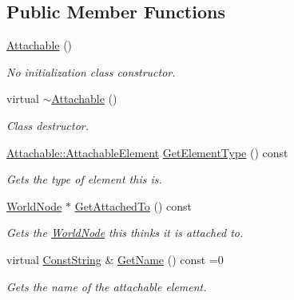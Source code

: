 \subsection*{Public Member Functions}
\begin{DoxyCompactItemize}
\item 
\hypertarget{classphys_1_1Attachable_a93c18f22769a1f70ae300fc2c58210eb}{
\hyperlink{classphys_1_1Attachable_a93c18f22769a1f70ae300fc2c58210eb}{Attachable} ()}
\label{df/dbd/classphys_1_1Attachable_a93c18f22769a1f70ae300fc2c58210eb}

\begin{DoxyCompactList}\small\item\em No initialization class constructor. \item\end{DoxyCompactList}\item 
\hypertarget{classphys_1_1Attachable_af7187e29053b7fe339634394883729d4}{
virtual \hyperlink{classphys_1_1Attachable_af7187e29053b7fe339634394883729d4}{$\sim$Attachable} ()}
\label{df/dbd/classphys_1_1Attachable_af7187e29053b7fe339634394883729d4}

\begin{DoxyCompactList}\small\item\em Class destructor. \item\end{DoxyCompactList}\item 
\hyperlink{classphys_1_1Attachable_acd1fca033e7cc0bb3024a92d466d213a}{Attachable::AttachableElement} \hyperlink{classphys_1_1Attachable_a57d60b84bd49bf35732164ae4244e576}{GetElementType} () const 
\begin{DoxyCompactList}\small\item\em Gets the type of element this is. \item\end{DoxyCompactList}\item 
\hyperlink{classphys_1_1WorldNode}{WorldNode} $\ast$ \hyperlink{classphys_1_1Attachable_a6df6034ed61c98d350378bdd7a3129f6}{GetAttachedTo} () const 
\begin{DoxyCompactList}\small\item\em Gets the \hyperlink{classphys_1_1WorldNode}{WorldNode} this thinks it is attached to. \item\end{DoxyCompactList}\item 
\hypertarget{classphys_1_1Attachable_a0a07d727fa2630dc3550fd991ca28256}{
virtual \hyperlink{namespacephys_a5ce5049f8b4bf88d6413c47b504ebb31}{ConstString} \& \hyperlink{classphys_1_1Attachable_a0a07d727fa2630dc3550fd991ca28256}{GetName} () const =0}
\label{df/dbd/classphys_1_1Attachable_a0a07d727fa2630dc3550fd991ca28256}

\begin{DoxyCompactList}\small\item\em Gets the name of the attachable element. \item\end{DoxyCompactList}\end{DoxyCompactItemize}
